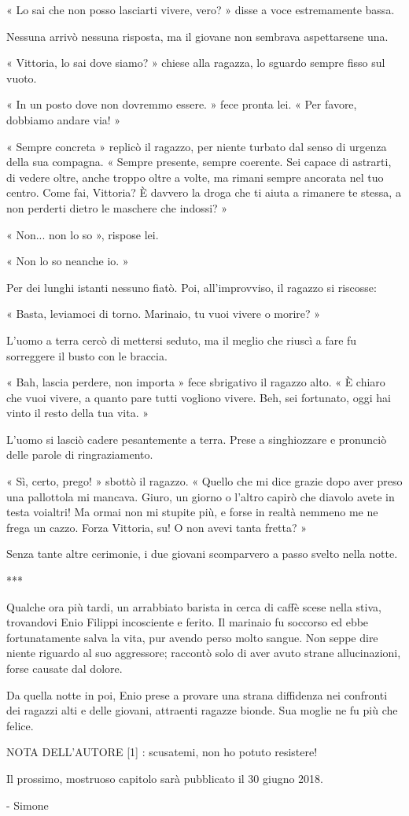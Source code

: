 « Lo sai che non posso lasciarti vivere, vero? » disse a voce estremamente bassa.

Nessuna arrivò nessuna risposta, ma il giovane non sembrava aspettarsene una.

« Vittoria, lo sai dove siamo? » chiese alla ragazza, lo sguardo sempre fisso sul vuoto.

« In un posto dove non dovremmo essere. » fece pronta lei. « Per favore, dobbiamo andare via! »

« Sempre concreta » replicò il ragazzo, per niente turbato dal senso di urgenza della sua compagna. « Sempre presente, sempre coerente. Sei capace di astrarti, di vedere oltre, anche troppo oltre a volte, ma rimani sempre ancorata nel tuo centro. Come fai, Vittoria? È davvero la droga che ti aiuta a rimanere te stessa, a non perderti dietro le maschere che indossi? »

« Non... non lo so », rispose lei.

« Non lo so neanche io. »

Per dei lunghi istanti nessuno fiatò. Poi, all'improvviso, il ragazzo si riscosse:

« Basta, leviamoci di torno. Marinaio, tu vuoi vivere o morire? »

L'uomo a terra cercò di mettersi seduto, ma il meglio che riuscì a fare fu sorreggere il busto con le braccia.

« Bah, lascia perdere, non importa » fece sbrigativo il ragazzo alto. « È chiaro che vuoi vivere, a quanto pare tutti vogliono vivere. Beh, sei fortunato, oggi hai vinto il resto della tua vita. »

L'uomo si lasciò cadere pesantemente a terra. Prese a singhiozzare e pronunciò delle parole di ringraziamento.

« Sì, certo, prego! » sbottò il ragazzo. « Quello che mi dice grazie dopo aver preso una pallottola mi mancava. Giuro, un giorno o l'altro capirò che diavolo avete in testa voialtri! Ma ormai non mi stupite più, e forse in realtà nemmeno me ne frega un cazzo. Forza Vittoria, su! O non avevi tanta fretta? »

Senza tante altre cerimonie, i due giovani scomparvero a passo svelto nella notte.

***

Qualche ora più tardi, un arrabbiato barista in cerca di caffè scese nella stiva, trovandovi Enio Filippi incosciente e ferito. Il marinaio fu soccorso ed ebbe fortunatamente salva la vita, pur avendo perso molto sangue. Non seppe dire niente riguardo al suo aggressore; raccontò solo di aver avuto strane allucinazioni, forse causate dal dolore.

Da quella notte in poi, Enio prese a provare una strana diffidenza nei confronti dei ragazzi alti e delle giovani, attraenti ragazze bionde. Sua moglie ne fu più che felice.

NOTA DELL'AUTORE
[1] : scusatemi, non ho potuto resistere!

Il prossimo, mostruoso capitolo sarà pubblicato il 30 giugno 2018.

- Simone



